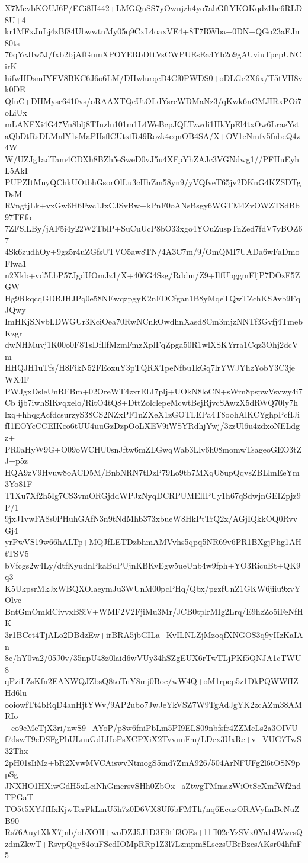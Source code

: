 X7McvbKOUJ6P/ECi8H442+LMGQnSS7yOwnjzh4yo7ahGftYKOKqdz1bc6RLD8U+4
kr1MFxJnLj4zBf84UbwwtnMy05q9CxL4oaxVE4+8T7RWba+0DN+QGo23aEJn80ts
76qYcJIw5J/fxb2bjAfGumXPOYERbDttVsCWPUEsEa4Yb2o9gAUviuTpcpUNCirK
hifwHDsmIYFV8BKC6J6o6LM/DHwlurqeD4Cf0PWDS0+oDLGe2X6x/T5tVH8vk0DE
QfuC+DHMysc6410vs/oRAAXTQeUtOLdYsrcWDMaNz3/qKwk6nCMJIRxPOi7oLiUx
mLANFXi4G47Vn8blj8TInzlu101m1L4WeBcpJQLTzwdi1HkYpEl4txOw6LraeYst
aQbDtRsDLMnlY1sMaPHsflCUtxfR49Rozk4cqnOB4SA/X+OV1eNmfv5fnbeQ4z4W
W/UZJg1adTam4CDXh8BZh5eSweD0vJ5u4XFpYhZAJc3VGNdwg1//PFHuEyhL5AkI
PUPZItMnyQChkUOtbhGsorOlLu3cHhZm58yn9/yVQfveT65jv2DKnG4KZSDTgDsM
RVngtjLk+vxGw6H6Fwc1JxCJSvBw+kPnF0oANsBsgy6WGTM4ZvOWZTSdBb97TEfo
7ZFSlLBy/jAF5i4y22W2TblP+SuCuUcP8bO33xgo4YOuZuspTnZed7fdV7yBOZ67
4Sk6zudhOy+9gz5r4uZGfsUTVO5aw8TN/4A3C7m/9/OmQMI7UADa6wFaDmoFlwa1
n2Xkb+vd5LbP57JgdUOmJz1/X+406G4Ssg/Rddm/Z9+IlfUbggmFljP7DOzF5ZGW
Hg9RkqcqGDBJHJPq0e58NEwqzpgyK2nFDCfgan1B8yMqeTQwTZchKSAvb9FqJQwy
ImHKjSNvbLDWGUr3KciOea70RwNCnkOwdhnXasd8Cm3mjzNNTf3Gvfj4TmebKzgr
dwNHMuvj1K00o0F8TsDfIlfMzmFmzXplFqZpga50R1wlXSKYrra1Cqz3Ohj2dcVm
HHQJH1uTfs/H8FikN52FEoxuY3pTQRXTpeNfbu1kGq7lrYWJYhzYobY3C3jeWX4F
PWJgxDsleUnRFBm+02OreWT4zxrELI7plj+UOkN8loCN+sWrn8pspwVsvwy4i7Cb
ijb7iwhSIKvqxelo/RitO4tQ8+DttZolclepeMcwtBejRjvcSAwzX5dRWQ70ly7h
lxq+hhqgAcfdcsurzyS38CS2NZxPF1nZXeX1zGOTLEPa4T8oohAlKCYghpPcfIJi
fI1EOYcCCEIKco6tUU4uuGzDzpOoLXEV9iWSYRdhjYwj/3zzUl6u4zdxoNELdgz+
PR0aHyW9G+O09oWCHU0snJftw6mZLGwqWab3Llv6h08momwTsageoGEO3tZJ+p5z
HQA9zV9Hvuw8oACD5M/BnbNRN7tDzP79Lo9tb7MXqU8upQqvsZBLlmEeYm3Yo81F
T1Xu7Xf2h5Ig7CS3vmORGjddWPJzNyqDCRPUMElIPUy1h67qSdwjnGEIZpjz9P/1
9jxJ1vwFA8s0PHuhGAfN3n9tNdMhb373xbueW8HkPtTrQ2x/AGjIQkkOQ0RvvGj4
yrPwVS19w66hALTp+MQJfLETDzbhmAMVvhs5qpq5NR69v6PR1BXgjPhg1AHtTSV5
bVfcgs2w4Ly/dtfKyudnPkaBuPUjnKBKvEgw5ueUnb4w9fph+YO3RicuBt+QK9q3
K5UkpsrMkJxWBQXOlaeymJu3WUnM00pcPHq/Qbx/pgzfUnZ1GKW6jiiu9xvYOlvc
BntGmOmldCivvxBSiV+WMF2V2FjiMu3Mr/JCB0tplrMIg2Lrq/E9hzZo5iFeNfHK
3r1BCet4TjALo2DBdzEw+irBRA5jbGILa+KvILNLZjMzoqfXNGOS3q9yIIzKaIAn
8c/hY0va2/05J0v/35npU48z0laid6wVUy34hSZgEUX6rTwTLjPKf5QNJA1cTWU8
qPziLZsKfn2EANWQJZbsQ8toTnY8mj0Boc/wW4Q+oM1rpep5z1DkPQWWfIZHd6lu
ooiowfTt4bRqD4anHjtYWv/9AP2ubo7JwJeYkVSZ7W9TgAdJgYK2zcAZm38AMRIo
+eo9eMeTjX3ri/nwS9+AYoP/p8w6fniPbLm5PI9ELS09nbfsfr4ZZMcLs2a3OIVU
f7dswT9cDSFgPbULuuGdLHoPsXCPXiX2TvvunFm/LDex3UxRe+v+VUG7TwS32Thx
2pH01sIiMz+bR2XvwMVCAiswvNtmogS5md7ZmA926/504ArNFUFg2l6tOSN9ppSg
JNXHO1HXiwGdH5xLeiNhGmersvSHh0ZbOx+aZtwgTMmazWiOtScXmfWf2ndTPGaT
TO5t5XYJfIfxKjwTcrFkLmU5h7z0D6VX8Uf6bFMTk/nq6EcuzORAVyfmBeNuZB90
Rs76AuytXkX7jnb/obXOH+woDZJ5J1D3E9tlf3OEs+11fI02eYzSVx0Ya14WwrsQ
zdmZkwT+RsvpQqy84ouFScdIOMpRRp1Z3l7Lzmpm8LsezsUBrBzcsAKsr04hfuF5

